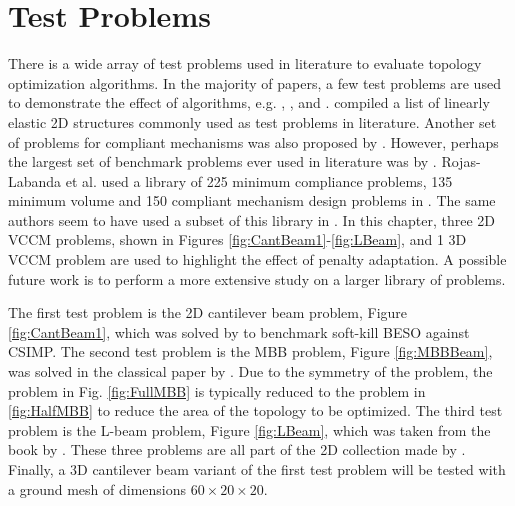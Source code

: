 \section{Test Problems} \label{sec:test_problems}

  

  There is a wide array of test problems used in literature to evaluate topology optimization algorithms. In the majority of papers, a few test problems are used to demonstrate the effect of algorithms, e.g. \cite{Huang2010a}, \cite{Stolpe2001a}, and \cite{SalazardeTroya2018}. \cite{Valdez2017} compiled a list of linearly elastic 2D structures commonly used as test problems in literature. Another set of problems for compliant mechanisms was also proposed by \cite{Deepak2009}. However, perhaps the largest set of benchmark problems ever used in literature was by \cite{Rojas-Labanda2015a, Rojas-Labanda2015}. Rojas-Labanda et al. used a library of 225 minimum compliance problems, 135 minimum volume and 150 compliant mechanism design problems in \cite{Rojas-Labanda2015a}. The same authors seem to have used a subset of this library in \cite{Rojas-Labanda2015}. In this chapter, three 2D VCCM problems, shown in Figures \ref{fig:CantBeam1}-\ref{fig:LBeam}, and 1 3D VCCM problem are used to highlight the effect of penalty adaptation. A possible future work is to perform a more extensive study on a larger library of problems.
  
  The first test problem is the 2D cantilever beam problem, Figure \ref{fig:CantBeam1}, which was solved by \cite{Huang2010a} to benchmark soft-kill BESO against CSIMP. The second test problem is the MBB problem, Figure \ref{fig:MBBBeam}, was solved in the classical paper by \cite{Sigmund2001}. Due to the symmetry of the problem, the problem in Fig. \ref{fig:FullMBB} is typically reduced to the problem in \ref{fig:HalfMBB} to reduce the area of the topology to be optimized. The third test problem is the L-beam problem, Figure \ref{fig:LBeam}, which was taken from the book by \cite{Bendsoe2004}. These three problems are all part of the 2D collection made by \cite{Valdez2017}. Finally, a 3D cantilever beam variant of the first test problem will be tested with a ground mesh of dimensions $60 \times 20 \times 20$.

